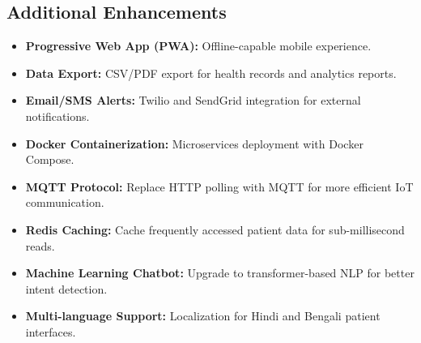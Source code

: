 \subsection{Additional Enhancements}
\begin{itemize}[leftmargin=*]
    \item \textbf{Progressive Web App (PWA):} Offline-capable mobile experience.
    \item \textbf{Data Export:} CSV/PDF export for health records and analytics reports.
    \item \textbf{Email/SMS Alerts:} Twilio and SendGrid integration for external notifications.
    \item \textbf{Docker Containerization:} Microservices deployment with Docker Compose.
    \item \textbf{MQTT Protocol:} Replace HTTP polling with MQTT for more efficient IoT communication.
    \item \textbf{Redis Caching:} Cache frequently accessed patient data for sub-millisecond reads.
    \item \textbf{Machine Learning Chatbot:} Upgrade to transformer-based NLP for better intent detection.
    \item \textbf{Multi-language Support:} Localization for Hindi and Bengali patient interfaces.
\end{itemize}

